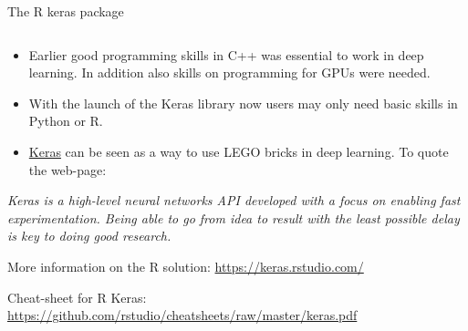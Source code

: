 \documentclass[10pt,ignorenonframetext,]{beamer}
\providecommand{\tightlist}{%
  \setlength{\itemsep}{0pt}\setlength{\parskip}{0pt}}
\begin{document}
\begin{frame}

\begin{block}{The R keras package}

\(~\)

\begin{itemize}
\tightlist
\item
  Earlier good programming skills in C++ was essential to work in deep
  learning. In addition also skills on programming for GPUs were needed.
\end{itemize}

\vspace{2mm}

\begin{itemize}
\tightlist
\item
  With the launch of the Keras library now users may only need basic
  skills in Python or R.
\end{itemize}

\vspace{2mm}

\begin{itemize}
\tightlist
\item
  \href{https://keras.io/}{Keras} can be seen as a way to use LEGO
  bricks in deep learning. To quote the web-page:
\end{itemize}

\vspace{4mm}

\emph{Keras is a high-level neural networks API developed with a focus
on enabling fast experimentation. Being able to go from idea to result
with the least possible delay is key to doing good research.}

\end{block}

\end{frame}

\begin{frame}

More information on the R solution: \url{https://keras.rstudio.com/}

Cheat-sheet for R Keras:
\url{https://github.com/rstudio/cheatsheets/raw/master/keras.pdf}

\end{frame}
\end{document}
